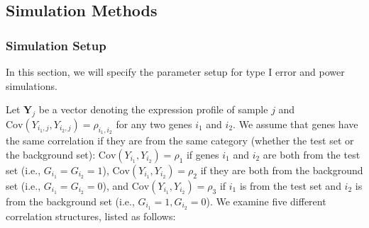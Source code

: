 \documentclass[a4,center,fleqn]{NAR}
\newcommand{\OurMethod}{MEQLEA}
\begin{document}
	
	\subsection{Simulation Methods}
	
	\subsubsection{Simulation Setup}\label{subsection:simulation}
	In this section, we will specify the parameter setup for type I error and power simulations. %
	
	Let $\bm Y_{j}$ be a vector denoting the expression profile of sample $j$ and $\text{Cov}(Y_{i_1, j}, Y_{i_2, j})=\rho_{i_1,i_2}$ for any two genes $i_1$ and $i_2$. 
	We assume that genes have the same correlation if they are from the same category (whether the test set or the background set): $\text{Cov}(Y_{i_1}, Y_{i_2})= \rho_1$ if
	genes $i_1$ and $i_2$ are both from the test set (i.e., $G_{i_1} = G_{i_2}=1$), 
	$\text{Cov}(Y_{i_1}, Y_{i_2}) =\rho_2$ if they are both from the background set (i.e., $G_{i_1} =
	G_{i_2}=0$), and  $\text{Cov}(Y_{i_1}, Y_{i_2})= \rho_3$ if $i_1$ is from the test set and $i_2$ is
	from the background set (i.e., $G_{i_1} =1,  G_{i_2}=0$). We examine five different correlation
	structures, listed as follows:
	
\end{document}
